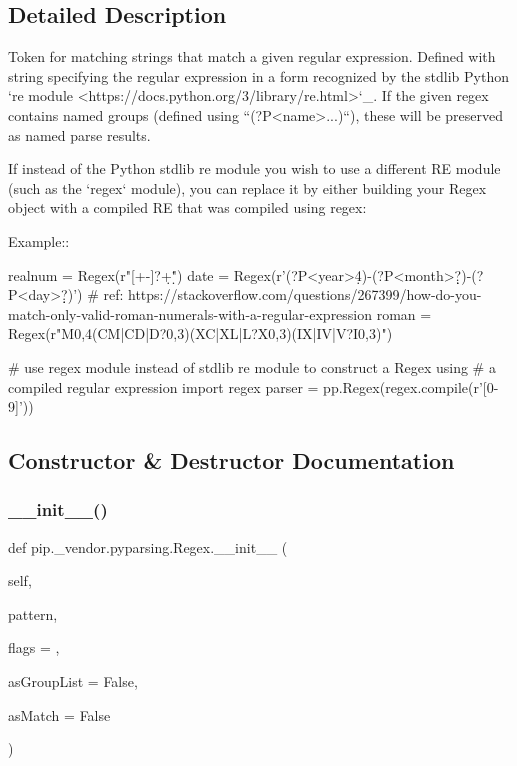\subsection{Detailed Description}
\begin{DoxyVerb}Token for matching strings that match a given regular
expression. Defined with string specifying the regular expression in
a form recognized by the stdlib Python  `re module <https://docs.python.org/3/library/re.html>`_.
If the given regex contains named groups (defined using ``(?P<name>...)``),
these will be preserved as named parse results.

If instead of the Python stdlib re module you wish to use a different RE module
(such as the `regex` module), you can replace it by either building your
Regex object with a compiled RE that was compiled using regex:

Example::

    realnum = Regex(r"[+-]?\d+\.\d*")
    date = Regex(r'(?P<year>\d{4})-(?P<month>\d\d?)-(?P<day>\d\d?)')
    # ref: https://stackoverflow.com/questions/267399/how-do-you-match-only-valid-roman-numerals-with-a-regular-expression
    roman = Regex(r"M{0,4}(CM|CD|D?{0,3})(XC|XL|L?X{0,3})(IX|IV|V?I{0,3})")

    # use regex module instead of stdlib re module to construct a Regex using
    # a compiled regular expression
    import regex
    parser = pp.Regex(regex.compile(r'[0-9]'))\end{DoxyVerb}
 

\subsection{Constructor \& Destructor Documentation}
\mbox{\label{classpip_1_1__vendor_1_1pyparsing_1_1Regex_a2b44bd1ca05c000b25dac463c7190972}} 
\subsubsection{\texorpdfstring{\+\_\+\+\_\+init\+\_\+\+\_\+()}{\_\_init\_\_()}}
{\footnotesize\ttfamily def pip.\+\_\+vendor.\+pyparsing.\+Regex.\+\_\+\+\_\+init\+\_\+\+\_\+ (\begin{DoxyParamCaption}\item[{}]{self,  }\item[{}]{pattern,  }\item[{}]{flags = {},  }\item[{}]{as\+Group\+List = {\ttfamily False},  }\item[{}]{as\+Match = {\ttfamily False} }\end{DoxyParamCaption})}

